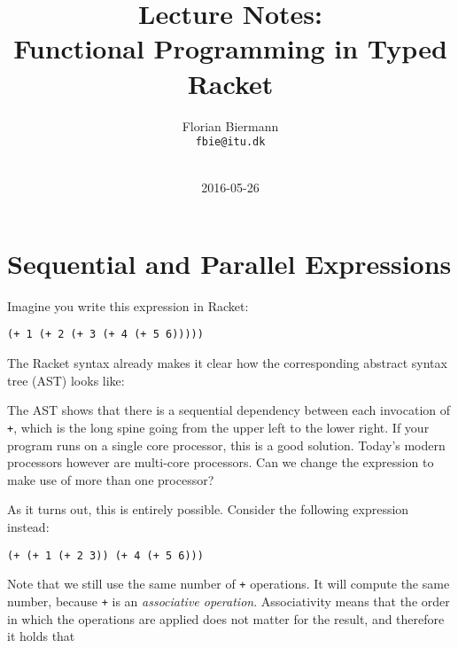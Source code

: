 \documentclass{article}
\title{Lecture Notes:\\Functional Programming in Typed Racket}
\author{Florian Biermann \\\small{\texttt{fbie@itu.dk}} \\~}
\date{2016-05-26}
\begin{document}
\maketitle

\section{Sequential and Parallel Expressions}

Imagine you write this expression in Racket:

\begin{center}
  \lstinline{(+ 1 (+ 2 (+ 3 (+ 4 (+ 5 6)))))}
\end{center}


The Racket syntax already makes it clear how the corresponding abstract syntax tree (AST) looks like:

\begin{center}
\end{center}

The AST shows that there is a sequential dependency between each invocation of \lstinline{+}, which is the long spine going from the upper left to the lower right. If your program runs on a single core processor, this is a good solution. Today's modern processors however are multi-core processors. Can we change the expression to make use of more than one processor?

As it turns out, this is entirely possible. Consider the following expression instead:

\begin{center}
  \lstinline{(+ (+ 1 (+ 2 3)) (+ 4 (+ 5 6)))}
\end{center}

Note that we still use the same number of \lstinline{+} operations. It will compute the same number, because \lstinline{+} is an \emph{associative operation}. Associativity means that the order in which the operations are applied does not matter for the result, and therefore it holds that
\end{document}
